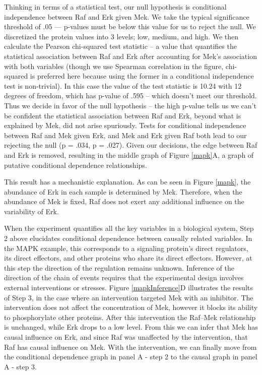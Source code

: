\documentclass[journal=jacsat,manuscript=article]{achemso}
\begin{document}
Thinking in terms of a statistical test, our null hypothesis is conditional independence between Raf and Erk given Mek.  We take the typical significance threshold of .05 --- p-values must be below this value for us to reject the null.  We discretized the protein values into 3 levels; low, medium, and high.  We then calculate the Pearson chi-squared test statistic -- a value that quantifies the statistical association between Raf and Erk after accounting for Mek's association with both variables (though we use Spearman correlation in the figure, chi-squared is preferred here because using the former in a conditional independence test is non-trivial).  In this case the value of the test statistic is 10.24 with 12 degrees of freedom, which has p-value of .595 -- which doesn't meet our threshold.  Thus we decide in favor of the null hypothesis -- the high p-value tells us we can't be confident the statistical association between Raf and Erk, beyond what is explained by Mek, did not arise spuriously.  Tests for conditional independence between Raf and Mek given Erk, and Mek and Erk given Raf both lead to our rejecting the null (p = .034, p = .027).  Given our decisions, the edge between Raf and Erk is removed, resulting in the middle graph of Figure \ref{mapk}A, a graph of putative conditional dependence relationships.

This result has a mechanistic explanation. As can be seen in Figure \ref{mapk}, the abundance of Erk in each sample is determined by Mek. Therefore, when the abundance of Mek is fixed, Raf does not exert any additional influence on the variability of Erk.  

When the experiment quantifies all the key variables in a biological system, Step 2 above elucidates conditional dependence between causally related variables. In the MAPK example, this corresponds to a signaling protein's direct regulators, its direct effectors, and other proteins who share its direct effectors.  However, at this step the direction of the regulation remains unknown. Inference of the direction of the chain of events requires that the experimental design involves external interventions or stresses. Figure \ref{mapkInference}D illustrates the results of Step 3, in the case where an intervention targeted Mek with an inhibitor. The intervention does not affect the concentration of Mek, however it blocks its ability to phosphorylate other proteins.  After this intervention the Raf--Mek relationship is unchanged, while Erk drops to a low level.  From this we can infer that Mek has causal influence on Erk, and since Raf was unaffected by the intervention, that Raf has causal influence on Mek.  With the intervention, we can finally move from the conditional dependence graph in panel A - step 2 to the causal graph in panel A - step 3.
\end{document}
